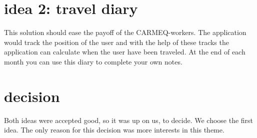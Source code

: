 \section{idea 2: travel diary}

This solution should ease the payoff of the CARMEQ-workers. The application would track the position of the user and with the help
of these tracks the application can calculate when the user have been traveled. At the end of each month you can use this diary to
complete your own notes.


\section{decision}

Both ideas were accepted good, so it was up on us, to decide. We choose the first idea. The only reason for this decision was
more interests in this theme.
 
 